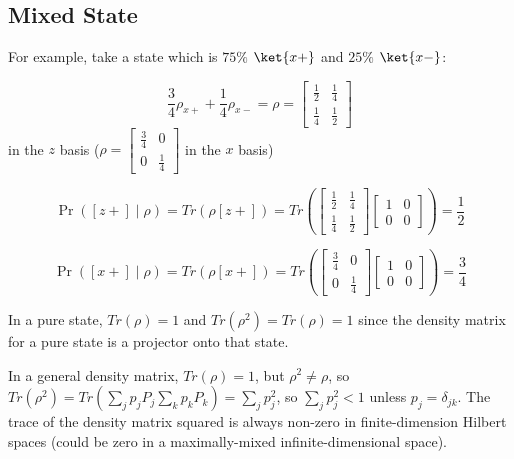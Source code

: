 \documentclass[a4paper,twoside,master.tex]{subfiles}
\begin{document}
\subsection{Mixed State}
\label{sub:mixed_state}

For example, take a state which is $75\%$ $\ket{x+}$ and $25\%$
$\ket{x-}$:

\begin{equation}
\frac{3}{4}\rho_{x+} + \frac{1}{4}\rho_{x-} = \rho = \begin{bmatrix}\frac{1}{2}&\frac{1}{4}\\\frac{1}{4}&\frac{1}{2}\end{bmatrix}
\end{equation}
in the $z$ basis
($\rho = \begin{bmatrix}\frac{3}{4}&0\\0&\frac{1}{4}\end{bmatrix}$ in
the $x$ basis)

\begin{equation}
\Pr([z+]\mid\rho) = Tr(\rho[z+]) = Tr(\begin{bmatrix}\frac{1}{2}&\frac{1}{4}\\\frac{1}{4}&\frac{1}{2}\end{bmatrix}\begin{bmatrix}1&0\\0&0\end{bmatrix}) = \frac{1}{2}
\end{equation}

\begin{equation}
\Pr([x+]\mid\rho) = Tr(\rho[x+]) = Tr(\begin{bmatrix}\frac{3}{4}&0\\0&\frac{1}{4}\end{bmatrix}\begin{bmatrix}1&0\\0&0\end{bmatrix}) = \frac{3}{4}
\end{equation}

In a pure state, $Tr(\rho) = 1$ and $Tr(\rho^2) = Tr(\rho) = 1$
since the density matrix for a pure state is a projector onto that
state.

In a general density matrix, $Tr(\rho) = 1$, but $\rho^2\neq\rho$,
so $Tr(\rho^2) = Tr(\sum_j  p_j P_j \sum_k p_k P_k) = \sum_j p_j^2$,
so $\sum_j p_j^2 < 1$ unless $p_j = \delta_{jk}$. The trace of the
density matrix squared is always non-zero in finite-dimension Hilbert
spaces (could be zero in a maximally-mixed infinite-dimensional space).
\end{document}
